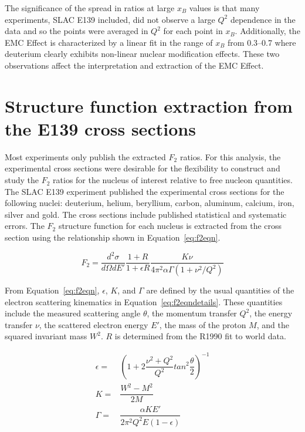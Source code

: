 \documentclass[oneside]{article}
\begin{document}
The significance of the spread in ratios at large $x_B$ values is that many experiments, SLAC E139 included, did not observe a large $Q^2$ dependence in the data and so the points were averaged in $Q^2$ for each point in $x_B$. Additionally, the EMC Effect is characterized by a linear fit in the range of $x_B$ from 0.3--0.7 where deuterium clearly exhibits non-linear nuclear modification effects. These two observations affect the interpretation and extraction of the EMC Effect. 

\section{Structure function extraction from the E139 cross sections}

Most experiments only publish the extracted $F_2$ ratios. For this analysis, the experimental cross sections were desirable for the flexibility to construct and study the $F_2$ ratios for the nucleus of interest relative to free nucleon quantities. The SLAC E139 experiment published the experimental cross sections for the following nuclei: deuterium, helium, beryllium, carbon, aluminum, calcium, iron, silver and gold. The cross sections include published statistical and systematic errors. The $F_2$ structure function for each nucleus is extracted from the cross section using the relationship shown in Equation~\eqref{eq:f2eqn}.

\begin{equation}
F_2 = \dfrac{d^2\sigma}{d\Omega dE'}\dfrac{1+R}{1+\epsilon R}\dfrac{K\nu}{4\pi^2\alpha\Gamma (1+\nu^2/Q^2)}
\label{eq:f2eqn}
\end{equation}

From Equation~\eqref{eq:f2eqn}, $\epsilon$, $K$, and $\Gamma$ are defined by the usual quantities of the electron scattering kinematics in Equation~\eqref{eq:f2eqndetails}. These quantities include the measured scattering angle $\theta$, the momentum transfer $Q^2$, the energy transfer $\nu$, the scattered electron energy $E'$, the mass of the proton $M$, and the squared invariant mass $W^2$. $R$ is determined from the R1990 fit to world data.

\begin{align}
\epsilon=&(1+2\dfrac{\nu^2+Q^2}{Q^2}tan^2\dfrac{\theta}{2})^{-1}\\
K=&\dfrac{W^2-M^2}{2M}\\
\Gamma=&\dfrac{\alpha KE'}{2\pi^2Q^2E(1-\epsilon)}
\label{eq:f2eqndetails}
\end{align}
\end{document}
